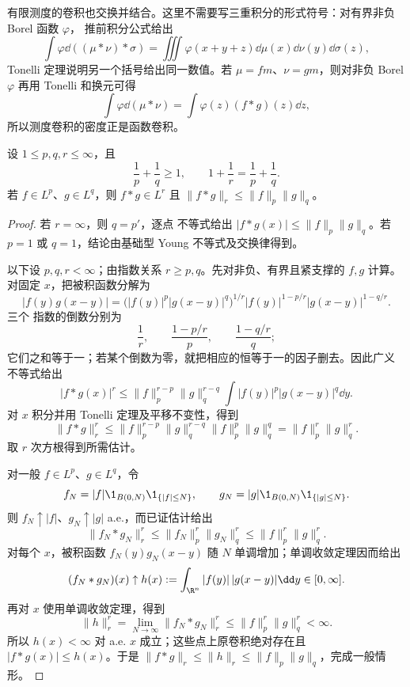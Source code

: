 有限测度的卷积也交换并结合。这里不需要写三重积分的形式符号：对有界非负 Borel 函数 $\varphi$，
推前积分公式给出
\[
 \int\varphi\dd((\mu*\nu)*\sigma)
 =\iiint\varphi(x+y+z)\dd\mu(x)\dd\nu(y)\dd\sigma(z),
\]
Tonelli 定理说明另一个括号给出同一数值。若 $\mu=fm$、$\nu=gm$，则对非负 Borel
$\varphi$ 再用 Tonelli 和换元可得
\[
 \int\varphi\dd(\mu*\nu)
 =\int\varphi(z)(f*g)(z)\dd z,
\]
所以测度卷积的密度正是函数卷积。

\begin{proposition}\label{proposition:4-4-1-4}
设 $1\le p,q,r\le\infty$，且
\[
 \frac1p+\frac1q\ge1,\qquad
 1+\frac1r=\frac1p+\frac1q.
\]
若 $f\in L^p$、$g\in L^q$，则 $f*g\in L^r$ 且
$\|f*g\|_r\le\|f\|_p\|g\|_q$。
\end{proposition}

\begin{proof}
若 $r=\infty$，则 $q=p'$，逐点 \Holder{} 不等式给出
$|f*g(x)|\le\|f\|_p\|g\|_q$。若 $p=1$ 或 $q=1$，结论由基础型 Young 不等式及交换律得到。

以下设 $p,q,r<\infty$；由指数关系 $r\ge p,q$。先对非负、有界且紧支撑的 $f,g$ 计算。对固定
$x$，把被积函数分解为
\[
 |f(y)g(x-y)|
 =\bigl(|f(y)|^p|g(x-y)|^q\bigr)^{1/r}
 |f(y)|^{1-p/r}|g(x-y)|^{1-q/r}.
\]
三个 \Holder{} 指数的倒数分别为
\[
 \frac1r,\qquad \frac{1-p/r}{p},\qquad
 \frac{1-q/r}{q};
\]
它们之和等于一；若某个倒数为零，就把相应的恒等于一的因子删去。因此广义 \Holder{} 不等式给出
\[
 |f*g(x)|^r
 \le \|f\|_p^{r-p}\|g\|_q^{r-q}
 \int |f(y)|^p|g(x-y)|^q\dd y.
\]
对 $x$ 积分并用 Tonelli 定理及平移不变性，得到
\[
 \|f*g\|_r^r
 \le \|f\|_p^{r-p}\|g\|_q^{r-q}
 \|f\|_p^p\|g\|_q^q
 =\|f\|_p^r\|g\|_q^r.
\]
取 $r$ 次方根得到所需估计。

对一般 $f\in L^p$、$g\in L^q$，令
\[
 f_N=|f|\1_{B(0,N)}\1_{\{|f|\leq N\}},\qquad
 g_N=|g|\1_{B(0,N)}\1_{\{|g|\leq N\}}.
\]
则 $f_N\uparrow|f|$、$g_N\uparrow|g|$ a.e.，而已证估计给出
\[
 \|f_N*g_N\|_r^r
 \leq\|f_N\|_p^r\|g_N\|_q^r
 \leq\|f\|_p^r\|g\|_q^r.
\]
对每个 $x$，被积函数 $f_N(y)g_N(x-y)$ 随 $N$ 单调增加；单调收敛定理因而给出
\[
 (f_N*g_N)(x)\uparrow
 h(x):=\int_{\R^n}|f(y)|\,|g(x-y)|\dd y\in[0,\infty].
\]
再对 $x$ 使用单调收敛定理，得到
\[
 \|h\|_r^r=\lim_{N\to\infty}\|f_N*g_N\|_r^r
 \leq\|f\|_p^r\|g\|_q^r<\infty.
\]
所以 $h(x)<\infty$ 对 a.e. $x$ 成立；这些点上原卷积绝对存在且
$|f*g(x)|\leq h(x)$。于是
$\|f*g\|_r\leq\|h\|_r\leq\|f\|_p\|g\|_q$，完成一般情形。
\end{proof}

